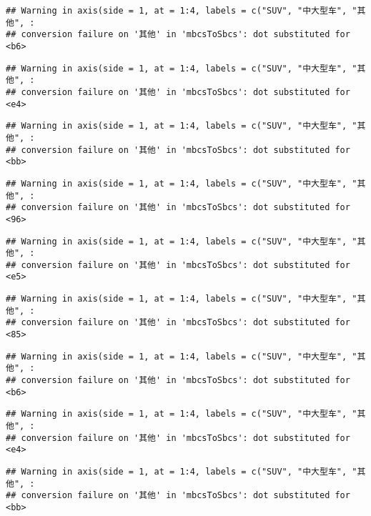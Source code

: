 \documentclass[]{article}
\begin{document}
\begin{verbatim}
## Warning in axis(side = 1, at = 1:4, labels = c("SUV", "中大型车", "其他", :
## conversion failure on '其他' in 'mbcsToSbcs': dot substituted for <b6>
\end{verbatim}

\begin{verbatim}
## Warning in axis(side = 1, at = 1:4, labels = c("SUV", "中大型车", "其他", :
## conversion failure on '其他' in 'mbcsToSbcs': dot substituted for <e4>
\end{verbatim}

\begin{verbatim}
## Warning in axis(side = 1, at = 1:4, labels = c("SUV", "中大型车", "其他", :
## conversion failure on '其他' in 'mbcsToSbcs': dot substituted for <bb>
\end{verbatim}

\begin{verbatim}
## Warning in axis(side = 1, at = 1:4, labels = c("SUV", "中大型车", "其他", :
## conversion failure on '其他' in 'mbcsToSbcs': dot substituted for <96>
\end{verbatim}

\begin{verbatim}
## Warning in axis(side = 1, at = 1:4, labels = c("SUV", "中大型车", "其他", :
## conversion failure on '其他' in 'mbcsToSbcs': dot substituted for <e5>
\end{verbatim}

\begin{verbatim}
## Warning in axis(side = 1, at = 1:4, labels = c("SUV", "中大型车", "其他", :
## conversion failure on '其他' in 'mbcsToSbcs': dot substituted for <85>
\end{verbatim}

\begin{verbatim}
## Warning in axis(side = 1, at = 1:4, labels = c("SUV", "中大型车", "其他", :
## conversion failure on '其他' in 'mbcsToSbcs': dot substituted for <b6>
\end{verbatim}

\begin{verbatim}
## Warning in axis(side = 1, at = 1:4, labels = c("SUV", "中大型车", "其他", :
## conversion failure on '其他' in 'mbcsToSbcs': dot substituted for <e4>
\end{verbatim}

\begin{verbatim}
## Warning in axis(side = 1, at = 1:4, labels = c("SUV", "中大型车", "其他", :
## conversion failure on '其他' in 'mbcsToSbcs': dot substituted for <bb>
\end{verbatim}
\end{document}
